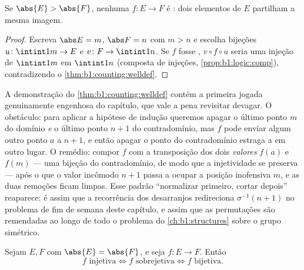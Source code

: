 \begin{corollary}\label{cor:b1:counting:pigeonhole}
Se $\abs{E} > \abs{F}$, nenhuma  $f \colon E \to F$ é : dois
elementos de $E$ partilham a mesma imagem.
\end{corollary}

\begin{proof}
Escreva $\abs E = m$, $\abs F = n$ com $m > n$ e escolha bijeções
$u \colon \intint1m \to E$ e $v \colon F \to \intint1n$. Se $f$
fosse , $v \circ f \circ u$ seria uma injeção de
$\intint1m$ em $\intint1n$ (composta de injeções,
\cref{prop:b1:logic:comp}), contradizendo o
\cref{thm:b1:counting:welldef}.
\end{proof}

\begin{remark}\label{rem:b1:counting:swapinterlude}
A demonstração do \cref{thm:b1:counting:welldef} contém a primeira
jogada genuinamente engenhosa do capítulo, que vale a pena revisitar
devagar. O obstáculo: para aplicar a hipótese de indução queremos
apagar o último ponto $m$ do domínio \emph{e} o último ponto
$n+1$ do contradomínio, mas $f$ pode enviar algum outro ponto $a$ a $n
+ 1$, e então apagar o ponto do contradomínio estraga a  em
outro lugar. O remédio: compor $f$ com a transposição dos
dois \emph{valores} $f(a)$ e $f(m)$ --- uma bijeção do
contradomínio, de modo que a injetividade se preserva --- após o que o
valor incômodo $n + 1$ passa a ocupar a posição inofensiva $m$, e
as duas remoções ficam limpas. Esse padrão ``normalizar primeiro,
cortar depois'' reaparece: é assim que a recorrência dos desarranjos
redireciona $\sigma^{-1}(n+1)$ no problema de fim de semana deste capítulo, e
assim que as permutações são remendadas ao longo de todo o problema do
\cref{ch:b1:structures} sobre o grupo simétrico.
\end{remark}

\begin{proposition}\label{prop:b1:counting:injsur}
Sejam $E, F$  com $\abs{E} = \abs{F}$, e seja $f \colon E
\to F$. Então
\[
f \text{ injetiva} \iff f \text{ sobrejetiva} \iff f \text{ bijetiva}.
\]
\end{proposition}

